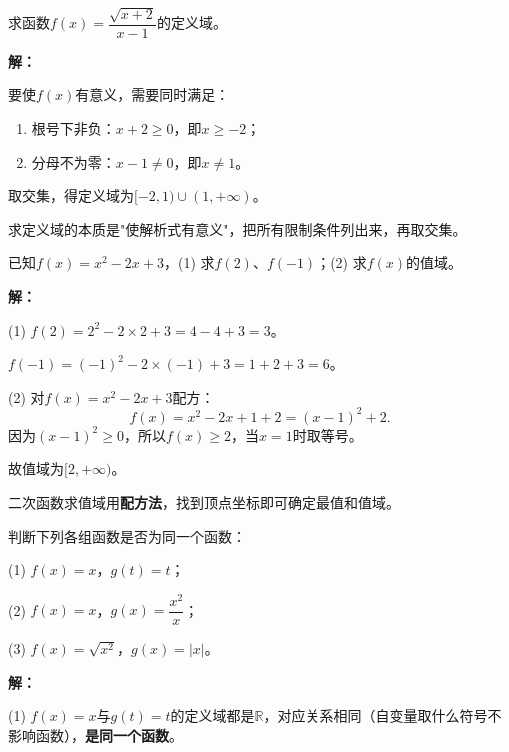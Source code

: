 \documentclass[12pt, a4paper]{ctexart}
\begin{document}
\begin{examplebox}[【例1】求函数的定义域]
求函数$f(x)=\dfrac{\sqrt{x+2}}{x-1}$的定义域。
\end{examplebox}

\textbf{解：}

要使$f(x)$有意义，需要同时满足：
\begin{enumerate}[leftmargin=2em]
  \item 根号下非负：$x+2\geq 0$，即$x\geq -2$；
  \item 分母不为零：$x-1\neq 0$，即$x\neq 1$。
\end{enumerate}
取交集，得定义域为$[-2,1)\cup(1,+\infty)$。

\begin{tipbox}[方法总结]
求定义域的本质是"使解析式有意义"，把所有限制条件列出来，再取交集。
\end{tipbox}

\vspace{6pt}

\begin{examplebox}[【例2】求函数值与值域]
已知$f(x)=x^2-2x+3$，(1) 求$f(2)$、$f(-1)$；(2) 求$f(x)$的值域。
\end{examplebox}

\textbf{解：}

(1) $f(2)=2^2-2\times 2+3=4-4+3=3$。

$f(-1)=(-1)^2-2\times(-1)+3=1+2+3=6$。

(2) 对$f(x)=x^2-2x+3$配方：
\[f(x)=x^2-2x+1+2=(x-1)^2+2.\]
因为$(x-1)^2\geq 0$，所以$f(x)\geq 2$，当$x=1$时取等号。

故值域为$[2,+\infty)$。

\begin{tipbox}[方法总结]
二次函数求值域用\textbf{配方法}，找到顶点坐标即可确定最值和值域。
\end{tipbox}

\vspace{6pt}

\begin{examplebox}[【例3】判断两个函数是否相同]
判断下列各组函数是否为同一个函数：

(1) $f(x)=x$，$g(t)=t$；

(2) $f(x)=x$，$g(x)=\dfrac{x^2}{x}$；

(3) $f(x)=\sqrt{x^2}$，$g(x)=|x|$。
\end{examplebox}

\textbf{解：}

(1) $f(x)=x$与$g(t)=t$的定义域都是$\mathbb{R}$，对应关系相同（自变量取什么符号不影响函数），\textbf{是同一个函数}。
\end{document}
